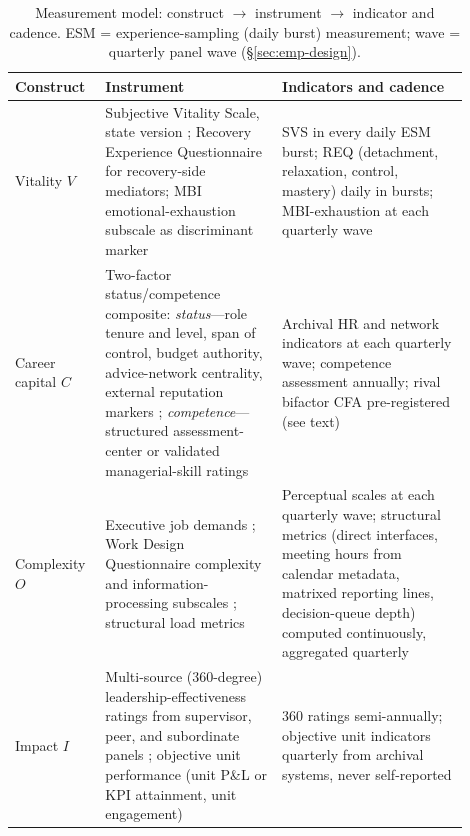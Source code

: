 \begin{table}[t]
\centering
\caption{Measurement model: construct $\to$ instrument $\to$ indicator and
cadence. ESM = experience-sampling (daily burst) measurement; wave =
quarterly panel wave (\S\ref{sec:emp-design}).}
\label{tab:measurement}
\vspace{0.4em}
\small
\begin{tabular}{p{0.16\linewidth}p{0.36\linewidth}p{0.38\linewidth}}
\toprule
Construct & Instrument & Indicators and cadence \\
\midrule
Vitality $V$ &
Subjective Vitality Scale, state version
\citep{ryan1997subjective,nix1999revitalization}; Recovery Experience
Questionnaire \citep{sonnentag2007recovery} for recovery-side mediators;
MBI emotional-exhaustion subscale \citep{maslach1981burnout} as
discriminant marker &
SVS in every daily ESM burst; REQ (detachment, relaxation, control,
mastery) daily in bursts; MBI-exhaustion at each quarterly wave \\
\addlinespace
Career capital $C$ &
Two-factor status/competence composite: \emph{status}---role tenure and
level, span of control, budget authority, advice-network centrality,
external reputation markers \citep{becker1993human,cross2003energy};
\emph{competence}---structured assessment-center or validated
managerial-skill ratings &
Archival HR and network indicators at each quarterly wave; competence
assessment annually; rival bifactor CFA pre-registered (see text) \\
\addlinespace
Complexity $O$ &
Executive job demands \citep{hambrick2005executive,zhu2022executive};
Work Design Questionnaire complexity and information-processing subscales
\citep{morgeson2006wdq,parker2017workdesign}; structural load metrics
\citep{garicano2000hierarchies} &
Perceptual scales at each quarterly wave; structural metrics (direct
interfaces, meeting hours from calendar metadata, matrixed reporting
lines, decision-queue depth) computed continuously, aggregated
quarterly \\
\addlinespace
Impact $I$ &
Multi-source (360-degree) leadership-effectiveness ratings from
supervisor, peer, and subordinate panels \citep{bracken2001multisource};
objective unit performance (unit P\&L or KPI attainment, unit engagement)
\citep{hambrick2007upper,edmans2016executive} &
360 ratings semi-annually; objective unit indicators quarterly from
archival systems, never self-reported \\
\bottomrule
\end{tabular}
\end{table}

